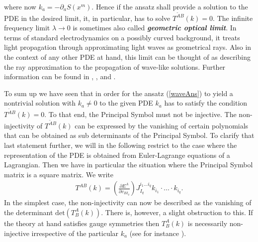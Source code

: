 where now $k_a = - \partial_aS(x^m)$. Hence if the ansatz shall provide a solution to the PDE in the desired limit, it, in particular, has to solve $T^{\tilde{A} B}(k) = 0$. The infinite frequency limit $\lambda \rightarrow 0 $ is sometimes also called \textit{\textbf{geometric optical limit}}. In terms of standard electrodynamics on a possibly curved background, it treats light propagation through approximating light waves as geometrical rays. Also in the context of any other PDE at hand, this limit can be thought of as describing the ray approximation to the propagation of wave-like solutions. Further information can be found in \cite{seiler1994analysis}, \cite{2012arXiv1211.1914K}, \cite{2011PhRvD..83d4047R} and \cite{2018PhRvD..97h4036D}.

To sum up we have seen that in order for the ansatz (\ref{waveAns}) to yield a nontrivial solution with $k_a \neq 0$ to the given PDE $k_a$ has to satisfy the condition $T^{\tilde{A} B}(k) = 0$. To that end, the Principal Symbol must not be injective. The non-injectivity of $T^{\tilde{A} B}(k)$ can be expressed by the vanishing of certain polynomials that can be obtained as sub determinants of the Principal Symbol. To clarify that last statement further, we will in the following restrict to the case where the representation of the PDE is obtained from Euler-Lagrange equations of a Lagrangian. Then we have in particular the situation where the Principal Symbol matrix is a square matrix. We write 
\begin{align}
T^{A B}(k) =  \left ( \frac{\partial E^{A}}{\partial v_{BI_q}} \right ) J_{I_q}^{i_1...i_q} k_{i_1} \cdot ... \cdot k_{i_q}.
\end{align}
In the simplest case, the non-injectivity can now be described as the vanishing of the determinant $\mathrm{det}(T^A_B(k))$. There is, however, a slight obstruction to this. If the theory at hand satisfies gauge symmetries then $T^A_B(k)$ is necessarily non-injective irrespective of the particular $k_a$ (see for instance \cite{2018PhRvD..97h4036D}).

